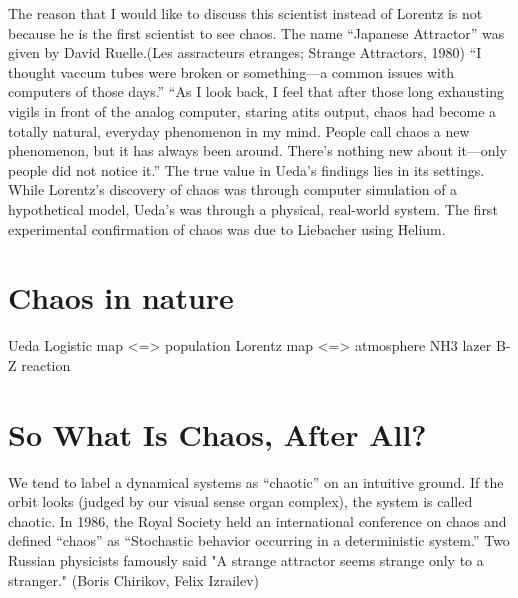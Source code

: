 \documentclass[12pt,twoside]{book}
\begin{document}
The reason that I would like to discuss this scientist instead of Lorentz is not because he is the first scientist to see chaos.
The name ``Japanese Attractor'' was given by David Ruelle.(Les assracteurs etranges; Strange Attractors, 1980)
``I thought vaccum tubes were broken or something---a common issues with computers of those days.'' \citep{lorentzbook} %
``As I look back, I feel that after those long exhausting vigils in front of the analog computer, staring atits output, chaos had become a totally natural, everyday phenomenon in my mind.
People call chaos a new phenomenon, but it has always been around.
There's nothing new about it---only people did not notice it.''\cite[p27]{ueda-abraham}
The true value in Ueda's findings lies in its settings.
While Lorentz's discovery of chaos was through computer simulation of a hypothetical model, Ueda's was through a physical, real-world system.
The first experimental confirmation of chaos was due to Liebacher using Helium.

\section{Chaos in nature}
Ueda
Logistic map <=> population
Lorentz map  <=> atmosphere
NH3 lazer
B-Z reaction

\section{So What Is Chaos, After All?}
We tend to label a dynamical systems as ``chaotic'' on an intuitive ground.
If the orbit looks (judged by our visual sense organ complex), the system is called chaotic.
In 1986, the Royal Society held an international conference on chaos and defined ``chaos'' as ``Stochastic behavior occurring in a deterministic system.'' \cite{stewart}
Two Russian physicists famously said "A strange attractor seems strange only to a stranger."
(Boris Chirikov, Felix Izrailev)\cite{lorentzbook}
\end{document}
